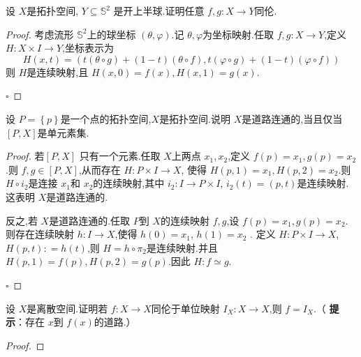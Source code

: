 \documentclass[../../几何与拓扑.tex]{subfiles}
\begin{document}
\begin{problemset}
    \item 设 \(  X  \)是拓扑空间, \(  Y\subseteq \mathbb{S}^{2}  \)  是开上半球.证明任意 \(  f,g:X\to Y  \)同伦.
    \begin{proof}
    
        考虑流形 \(  \mathbb{S}^{2}  \)上的球坐标 \(  \left(  \theta , \varphi  \right)   \).记
        \(   \theta , \varphi   \)为坐标映射.任取 \(  f,g:X \to Y  \),定义 \(  H: X\times I\to Y  \),坐标表示为\[
        H\left( x,t \right) =  \left( t\left(  \theta \circ g \right)+ \left( 1-t \right)\left(  \theta \circ f \right), t\left(  \varphi \circ g  \right)+ \left( 1-t \right)\left(  \varphi \circ f \right)       \right)  
        \]     则 \(  H  \)是连续映射,且 \( H\left( x,0 \right)= f\left( x \right) ,H\left( x,1 \right)= g\left( x \right)     \).  
    
        \hfill $\square$
    \end{proof} 

    \item 设 \(  P =  \left\{ p \right\}  \)是一个点的拓扑空间,\(  X  \)是拓扑空间.说明 \(  X  \)是道路连通的,当且仅当 \(  [P,X]  \)是单元素集.    
    \begin{proof}
    
      若\(  [P,X]  \) 只有一个元素.任取 \(  X  \)上两点 \(  x_1,x_2  \),定义 \(  f\left( p \right)= x_1,g\left( p \right)= x_2    \).则 \(  f,g \in [P,X]  \),从而存在 \(  H:P\times I \to X  \),
      使得 \(  H\left( p,1 \right)= x_1,H\left( p,2 \right)= x_2    \).则 \(  H\circ i_{2}  \)是连接 \(  x_1  \)和 \(  x_2  \)的连续映射,其中 \(  i_2: I\to P\times I  \), \(  i_2\left( t \right)= \left( p,t \right)    \)是连续映射.  这表明 \(  X  \)是道路连通的.
      
      
      反之,若 \(  X  \)是道路连通的.任取 \(  P  \)到 \(  X  \)的连续映射 \(  f,g  \),设 \(  f\left( p \right)= x_1,g\left( p \right)= x_2    \).则存在连续映射 \(  h: I \to X  \),使得 \(  h\left( 0 \right)=  x_1   \), \(  h\left( 1 \right)= x_2   \)        .
      定义 \(  H: P \times I \to X  \), \(  H \left( p,t \right): =  h\left( t \right)    \),则 \(  H =  h\circ \pi _2   \)是连续映射.并且 \(  H\left( p,1 \right) =  f\left( p \right),H\left( p,2 \right)= g\left( p \right)      \).因此 \(  H: f\simeq  g  \).     
    
        \hfill $\square$
    \end{proof}
    

    \item 设 \(  X  \)是离散空间.证明若 \(  f: X \to X  \)同伦于单位映射 \(  I _{X}: X\to X  \),则 \(  f =  I _{X}  \).（ \textbf{提示}：存在 \(  x  \)到 \(  f\left( x \right)   \)的道路.）      
    \begin{proof}
    

\end{proof}
\end{problemset}
\end{document}
